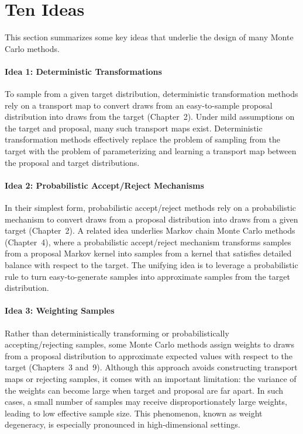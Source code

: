 \section{Ten Ideas}
\label{sec:1.4}

This section summarizes some key ideas that underlie the design of many Monte Carlo methods.

\paragraph{Idea 1: Deterministic Transformations}
To sample from a given target distribution, deterministic transformation methods rely on a transport
map to convert draws from an easy-to-sample proposal distribution into draws from the target
(Chapter~2). Under mild assumptions on the target and proposal, many such transport maps exist.
Deterministic transformation methods effectively replace the problem of sampling from the target
with the problem of parameterizing and learning a transport map between the proposal and target
distributions.

\paragraph{Idea 2: Probabilistic Accept/Reject Mechanisms}
In their simplest form, probabilistic accept/reject methods rely on a probabilistic mechanism to
convert draws from a proposal distribution into draws from a given target (Chapter~2). A related
idea underlies Markov chain Monte Carlo methods (Chapter~4), where a probabilistic accept/reject
mechanism transforms samples from a proposal Markov kernel into samples from a kernel that satisfies
detailed balance with respect to the target. The unifying idea is to leverage a probabilistic rule
to turn easy-to-generate samples into approximate samples from the target distribution.

\paragraph{Idea 3: Weighting Samples}
Rather than deterministically transforming or probabilistically accepting/rejecting samples, some
Monte Carlo methods assign weights to draws from a proposal distribution to approximate expected
values with respect to the target (Chapters~3 and~9). Although this approach avoids constructing
transport maps or rejecting samples, it comes with an important limitation: the variance of the
weights can become large when target and proposal are far apart. In such cases, a small number of
samples may receive disproportionately large weights, leading to low effective sample size. This
phenomenon, known as weight degeneracy, is especially pronounced in high-dimensional settings.

